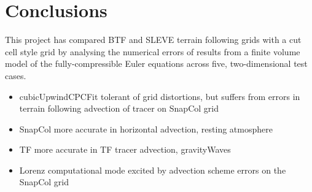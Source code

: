 \chapter{Conclusions}
This project has compared BTF and SLEVE terrain following grids with a cut cell style grid by analysing the numerical errors of results from a finite volume model of the fully-compressible Euler equations across five, two-dimensional test cases.

\begin{itemize}
\item cubicUpwindCPCFit tolerant of grid distortions, but suffers from errors in terrain following advection of tracer on SnapCol grid
\item SnapCol more accurate in horizontal advection, resting atmosphere
\item TF more accurate in TF tracer advection, gravityWaves
\item Lorenz computational mode excited by advection scheme errors on the SnapCol grid
\end{itemize}
